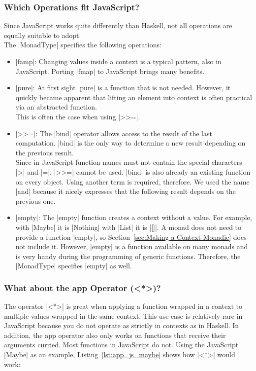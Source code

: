 \subsubsection{Which Operations fit JavaScript?} %
\label{subsub:Which operations fit JavaScript?}
Since JavaScript works quite differently than Haskell, not all operations are
equally suitable to adopt. \\
The |MonadType| specifies the following operations:
\begin{itemize}
  \item |famp|: Changing values inside a context is a typical pattern,
    also in JavaScript. Porting |fmap| to JavaScript brings many benefits.
  \item |pure|: At first sight |pure| is a function that is not needed.
    However, it quickly became apparent that lifting an element into context is
    often practical via an abstracted function. 
    \\ This is often the case when using |>>=|.
  \item |>>=|: The |bind| operator allows access to the result of the last
    computation. |bind| is the only way to determine a new result depending on
    the previous result. \\ Since in JavaScript function names must not contain
    the special characters |>| and |=|, |>>=| cannot be used. |bind| is also
    already an existing function on every object. Using another term is
    required, therefore. We used the name |and| because it nicely expresses
    that the following result depends on the previous one.
  \item |empty|: The |empty| function creates a context without a value. For
    example, with |Maybe| it is |Nothing| with |List| it is |[]|. A monad does
    not need to provide a function |empty|, so Section~\ref{sec:Making a
    Context Monadic} does not include it. However, |empty| is a function
    available on many monads and is very handy during the programming of
    generic functions. Therefore, the |MonadType| specifies |empty| as well.

\end{itemize}
\subsubsection{What about the app Operator (<*>)?} %
\label{sec:Which operations do not fit JavaScript?}
The operator |<*>| is great when applying a function wrapped in a context to
multiple values wrapped in the same context. This use-case is relatively rare
in JavaScript because you do not operate as strictly in contexts as in Haskell.
In addition, the app operator also only works on functions that receive their
arguments curried. Most functions in JavaScript do not. Using the JavaScript
|Maybe| as an example, Listing~\ref{lst:app_js_maybe} shows how |<*>| would
work:

